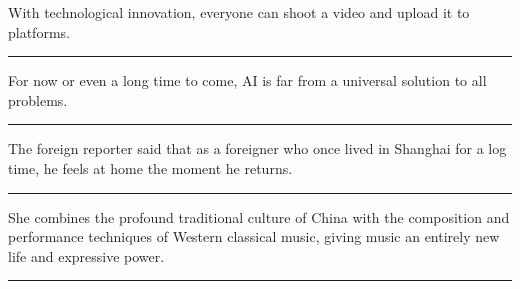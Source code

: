 \documentclass[11pt,a4paper]{article}
\newcommand{\num}[1]{\makebox[1.9em][r]{#1.}\hspace{0.3em}}
\newcommand{\wline}{\noindent\rule{\linewidth}{0.4pt}}
\begin{document}
\vspace{0.35em}\vspace{0.15em}

\begin{minipage}{\linewidth}

\num{39}With technological innovation, everyone can shoot a video and upload it to platforms.

\vspace{0.25em}

\wline

\end{minipage}

\begin{minipage}{\linewidth}

\num{40}For now or even a long time to come, AI is far from a universal solution to all problems.

\vspace{0.25em}

\wline

\end{minipage}

\begin{minipage}{\linewidth}

\num{41}The foreign reporter said that as a foreigner who once lived in Shanghai for a log time, he feels at home the moment he returns.

\vspace{0.25em}

\wline

\end{minipage}

\begin{minipage}{\linewidth}

\num{42}She combines the profound traditional culture of China with the composition and performance techniques of Western classical music, giving music an entirely new life and expressive power.

\vspace{0.25em}

\wline

\end{minipage}
\end{document}
